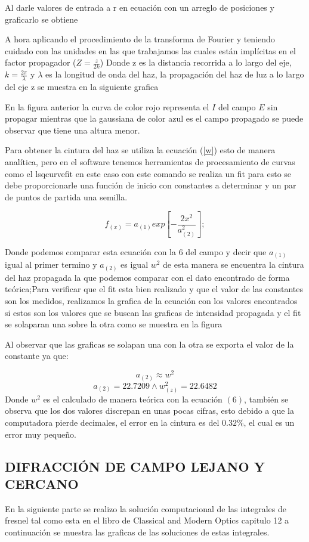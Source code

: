 \documentclass[11pt,letterpaper,twocolumn]{article}
\begin{document}
Al darle valores de entrada a r en ecuación con un arreglo de posiciones y graficarlo se obtiene 

\newpage
A hora aplicando el procedimiento de la transforma de Fourier y teniendo cuidado con las unidades en las que trabajamos las cuales están implícitas en el factor propagador ($Z=\frac{z}{2k}$) Donde z es la distancia recorrida a lo largo del eje, $k=\frac{2\pi}{\lambda}$ y $\lambda$ es la longitud de onda del haz, la propagación del haz de luz a lo largo del eje z se muestra en la siguiente grafica  


En la figura anterior la curva de color rojo  representa el $I$ del campo $E$ sin propagar  mientras que la gaussiana de color azul es el campo propagado se puede observar que tiene una altura menor.

Para obtener la cintura del haz se utiliza la ecuación (\ref{w}) esto de manera analítica, pero en el software tenemos herramientas de procesamiento de curvas como el lsqcurvefit en este caso con este comando se realiza un fit para esto se debe proporcionarle una función de inicio con constantes a determinar y un par de puntos de partida una semilla.

$$ f_{(x)}= a_{(1)}exp\left[-\frac{2x^{2}}{a_{(2)}^{2}}\right];$$

Donde podemos comparar esta ecuación con la $6$ del campo y decir que $a_{(1)}$ igual al primer termino y $a_{(2)}$ es igual $w^{2}$ de esta manera se encuentra la cintura del haz propagada la que podemos comparar con el dato encontrado de forma teórica;Para verificar que el fit esta bien realizado y que el valor de las constantes son los medidos, realizamos la grafica de la ecuación con los valores encontrados si estos son los valores que se buscan las graficas de intensidad propagada y el fit se solaparan una sobre la otra como se muestra en la figura


Al observar que las graficas se solapan una con la otra se exporta el valor de la constante ya que:

$$a_{(2)} \approx w^{2}$$
$$a_{(2)}= 22.7209 \wedge  w_{(z)}^{2}= 22.6482$$
Donde $w^{2}$ es el calculado de manera teórica con la ecuación $(6)$, también se observa que los dos valores discrepan en unas pocas cifras, esto debido a que la computadora pierde decimales, el error en la cintura es del $0.32\%$, el cual es un error muy pequeño. 
\subsection{DIFRACCIÓN DE CAMPO LEJANO Y CERCANO}
En la siguiente parte se realizo la solución computacional de las integrales de fresnel tal como esta en el libro de Classical and Modern Optics capitulo 12 a continuación se muestra las graficas de las soluciones de estas integrales.
\end{document}
